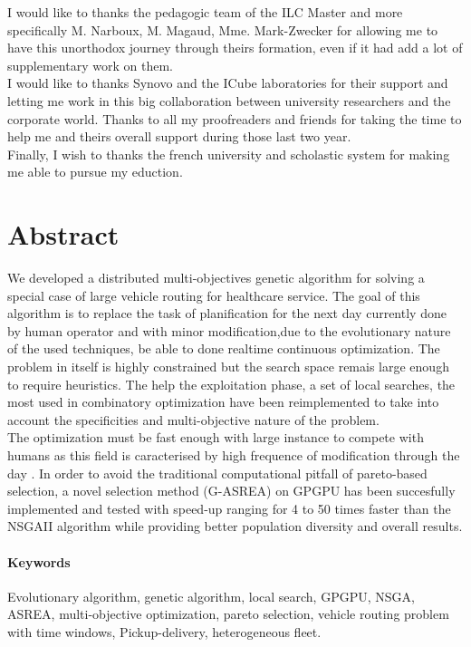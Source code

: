 \documentclass[12pt]{memoir}
\begin{document}
\bigskip
I would like to thanks the pedagogic team of the ILC Master and more specifically M. Narboux, M. Magaud, Mme. Mark-Zwecker for allowing me to have this unorthodox journey through theirs formation, even if it had add a lot of supplementary work on them. \\
I would like to thanks Synovo and the ICube laboratories for their support and
letting me work in this big collaboration between university researchers and the
corporate world.
Thanks to all my proofreaders and friends for taking the time to help me and theirs overall support during those last two year. \\
Finally, I wish to thanks the french university and scholastic system for making me able to pursue my eduction.  
\newpage

\section{Abstract}
We developed a distributed multi-objectives genetic algorithm for solving a special case of
large vehicle routing for healthcare service. The goal of this algorithm is to
replace the task of planification for the next day currently done by human operator and with
minor modification,due to the evolutionary nature of the used techniques, be able to
done realtime continuous optimization. The problem in itself is highly constrained
but the search space remais large enough to require heuristics. The help the
exploitation phase, a set of local searches, the most used in combinatory
optimization have been reimplemented to take into account the specificities and
multi-objective nature of the problem. \\
The optimization must be fast enough with large instance to compete with humans as
this field is  caracterised by high frequence of modification through the day . In
order to avoid the traditional computational pitfall of pareto-based selection, a
novel selection method (G-ASREA) on GPGPU has been succesfully implemented and tested with
speed-up ranging for 4 to 50 times faster than the NSGAII algorithm while providing
better population diversity and overall results.
\paragraph{Keywords}
Evolutionary algorithm, genetic algorithm, local search, GPGPU, NSGA, ASREA, multi-objective optimization, pareto selection, vehicle routing problem with time windows, Pickup-delivery, heterogeneous fleet.
\newpage
\end{document}

